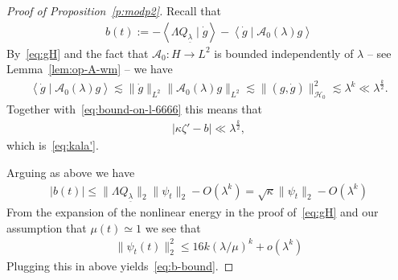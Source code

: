 \documentclass[10pt,reqno]{amsart}
\newcommand{\A}{\mathcal{A}}
\newcommand{\HH}{\mathcal{H}}
\newcommand{\la}{\lambda}
\newcommand{\ka}{\kappa}
\newcommand{\La}{\Lambda}
\newcommand{\ang}[1]{\left\langle{#1}\right\rangle}
\newcommand{\abs}[1]{\left\lvert{#1}\right\rvert}
\newcommand{\EQ}[1]{\begin{equation}\begin{split} #1 \end{split}\end{equation}}
\numberwithin{equation}{section}
\theoremstyle{remark}
\newcommand{\ula}{\underline{\lambda}}
\newcommand{\0}{\emptyset}
\begin{document}
\begin{proof}[Proof of Proposition~\ref{p:modp2}]
Recall that 
 \EQ{
 b(t):= - \ang{ \La Q_{\ula} \mid  \dot g}  - \ang{ \dot g \mid \A_0(\la) g}
}
 By~\eqref{eq:gH} and the fact that $\A_0: H \to L^2$ is bounded independently of $\la$ -- see Lemma~\ref{lem:op-A-wm} --  we have
\EQ{  \label{eq:dotgAg} 
 \ang{ \dot g \mid \A_0(\la) g} \lesssim  \| \dot g \|_{L^2} \| \A_0(\la) g \|_{L^2} \lesssim \| (g, \dot g) \|_{\HH_0}^2 \lesssim \la^k \ll \lambda^\frac k2.
 }
Together with~\eqref{eq:bound-on-l-6666} this  means that 
\EQ{
\abs{\kappa\zeta' - b}  \ll \lambda^\frac k2,
}
which is~\eqref{eq:kala'}. 

Arguing as above we have 
\EQ{
\abs{b(t)} \le \| \La Q_{\ula}\|_2 \| \psi_t\|_{2}  - O(\la^k) = \sqrt{\ka} \| \psi_t \|_2 - O(\la^k)
} 
From the expansion of the nonlinear energy in the proof of~\eqref{eq:gH} and our assumption that $\mu(t) \simeq  1$ we see that 
\EQ{
\| \psi_t(t) \|_2^2 \le 16k (\la/ \mu)^k  + o(\la^k)
}
Plugging this in above yields~\eqref{eq:b-bound}. 





\end{proof}
\end{document}

